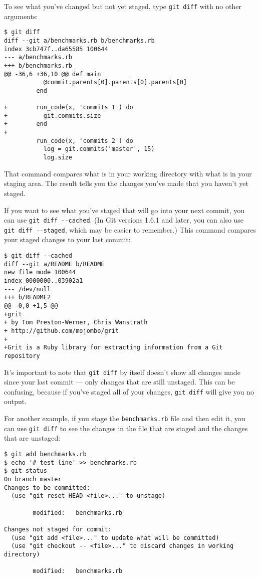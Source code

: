 \documentclass[a4paper]{book}
\begin{document}
To see what you've changed but not yet staged, type \texttt{git diff} with no other arguments:

\begin{shaded}\begin{verbatim}
$ git diff
diff --git a/benchmarks.rb b/benchmarks.rb
index 3cb747f..da65585 100644
--- a/benchmarks.rb
+++ b/benchmarks.rb
@@ -36,6 +36,10 @@ def main
           @commit.parents[0].parents[0].parents[0]
         end

+        run_code(x, 'commits 1') do
+          git.commits.size
+        end
+
         run_code(x, 'commits 2') do
           log = git.commits('master', 15)
           log.size
\end{verbatim}\end{shaded}

That command compares what is in your working directory with what is in your staging area. The result tells you the changes you've made that you haven't yet staged.

If you want to see what you've staged that will go into your next commit, you can use \texttt{git diff -{}-cached}. (In Git versions 1.6.1 and later, you can also use \texttt{git diff -{}-staged}, which may be easier to remember.) This command compares your staged changes to your last commit:

\begin{shaded}\begin{verbatim}
$ git diff --cached
diff --git a/README b/README
new file mode 100644
index 0000000..03902a1
--- /dev/null
+++ b/README2
@@ -0,0 +1,5 @@
+grit
+ by Tom Preston-Werner, Chris Wanstrath
+ http://github.com/mojombo/grit
+
+Grit is a Ruby library for extracting information from a Git repository
\end{verbatim}\end{shaded}

It's important to note that \texttt{git diff} by itself doesn't show all changes made since your last commit --- only changes that are still unstaged. This can be confusing, because if you've staged all of your changes, \texttt{git diff} will give you no output.

For another example, if you stage the \texttt{benchmarks.rb} file and then edit it, you can use \texttt{git diff} to see the changes in the file that are staged and the changes that are unstaged:

\begin{shaded}\begin{verbatim}
$ git add benchmarks.rb
$ echo '# test line' >> benchmarks.rb
$ git status
On branch master
Changes to be committed:
  (use "git reset HEAD <file>..." to unstage)

        modified:   benchmarks.rb

Changes not staged for commit:
  (use "git add <file>..." to update what will be committed)
  (use "git checkout -- <file>..." to discard changes in working directory)

        modified:   benchmarks.rb
\end{verbatim}\end{shaded}
\end{document}
